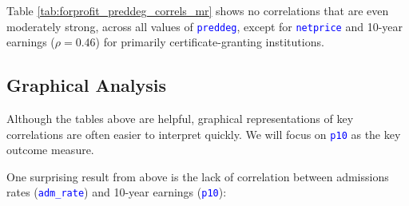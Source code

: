 \documentclass[12pt]{article}
\numberwithin{equation}{section}
\newcommand{\Varnm}[1]{\texttt{\textcolor{Blue}{#1}}}
\begin{document}
\begin{table}[ht!]
\caption{Correlations by primary degree granted (\Varnm{preddeg}) in for-profit institutions}
\label{tab:forprofit_preddeg_correls_mr}
\centering
{}
\end{table}

Table \ref{tab:forprofit_preddeg_correls_mr} shows no correlations that are even moderately strong, across all values of \Varnm{preddeg}, except for \Varnm{netprice} and 10-year earnings ($\rho = 0.46$) for primarily certificate-granting institutions.

\subsection{Graphical Analysis}
Although the tables above are helpful, graphical representations of key correlations are often easier to interpret quickly. We will focus on \Varnm{p10} as the key outcome measure.

One surprising result from above is the lack of correlation between admissions rates (\Varnm{adm\_rate}) and 10-year earnings (\Varnm{p10}):
\end{document}
